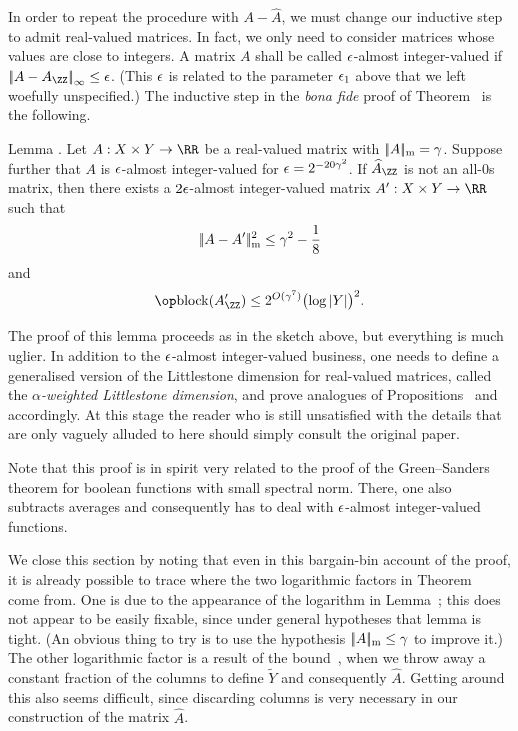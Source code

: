 In order to repeat the procedure with $A-\hat A$, we must change our inductive step to admit
real-valued matrices. In fact, we only need to consider matrices whose values are close to integers.
A matrix $A$ shall be called
{$\epsilon$-almost integer-valued} if $\norm{A-A_\ZZ}_\infty \le \eps$. (This $\epsilon$
is related to the parameter $\epsilon_1$ above that we left woefully unspecified.) The inductive
step in the {\it bona fide} proof of Theorem~{\thmGH} is the following.

\proclaim Lemma \advthm. Let $A:X\times Y\to \RR$ be a real-valued matrix with $|\!|A|\!|_{\rm m}=\gamma$.
Suppose further that $A$ is $\epsilon$-almost integer-valued for $\epsilon = 2^{-20\gamma^2}$. If $\hat A_\ZZ$
is not an all-$0$s matrix, then there exists a $2\epsilon$-almost integer-valued matrix $A':X\times Y\to \RR$
such that
$$|\!|A-A'|\!|_{\rm m}^2 \le \gamma^2 - {1\over 8}$$
and
$$\block(A_\ZZ') \le 2^{O(\gamma^7)} \bigl(\log|Y|\bigr)^2.$$

The proof of this lemma proceeds as in the sketch above, but everything is much uglier.
In addition to the $\epsilon$-almost integer-valued business,
one needs
to define a generalised version of the Littlestone dimension for real-valued matrices, called the
{\it $\alpha$-weighted Littlestone dimension}, and prove analogues of Propositions~{\propldimbound}
and~{\propfixedvector} accordingly.
At this stage the reader who is still unsatisfied with the details that are only vaguely
alluded to here should simply consult the
original paper.

Note that this proof is in spirit very related to the proof of the Green--Sanders theorem
for boolean functions with small spectral norm. There, one also subtracts averages and consequently
has to deal with $\epsilon$-almost integer-valued functions.

We close this section by noting that even in this bargain-bin account of the proof,
it is already possible to trace where the two logarithmic factors in
Theorem~{\thmGH} come from. One is due
to the appearance of the logarithm in Lemma~{\lempartition}; this does not appear to be easily
fixable, since under general hypotheses that lemma is tight. (An obvious thing to try is
to use the hypothesis
$|\!|A|\!|_{\rm m}\le \gamma$ to improve it.) The other logarithmic factor is a result of
the bound~, when we throw away a constant fraction of the columns to define $\tilde Y$
and consequently $\hat A$. Getting around this also seems difficult, since discarding columns is
very necessary in our construction of the matrix $\hat A$.



\bye
